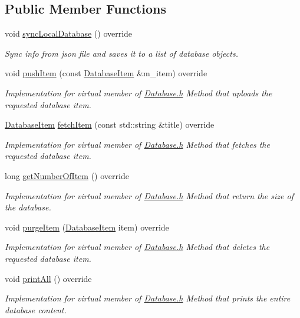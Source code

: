 \subsection*{Public Member Functions}
\begin{DoxyCompactItemize}
\item 
void \hyperlink{classSeriesDatabase_a0ba159b6d52a3cfa07135c7d8b37ef76}{sync\+Local\+Database} () override
\begin{DoxyCompactList}\small\item\em Sync info from json file and saves it to a list of database objects. \end{DoxyCompactList}\item 
void \hyperlink{classSeriesDatabase_a7591f89ab256d9f5a41235f5552e4e23}{push\+Item} (const \hyperlink{classDatabaseItem}{Database\+Item} \&m\+\_\+item) override
\begin{DoxyCompactList}\small\item\em Implementation for virtual member of \hyperlink{Database_8h_source}{Database.\+h} Method that uploads the requested database item. \end{DoxyCompactList}\item 
\hyperlink{classDatabaseItem}{Database\+Item} \hyperlink{classSeriesDatabase_af5303a723910395b31f2e01088de9130}{fetch\+Item} (const std\+::string \&title) override
\begin{DoxyCompactList}\small\item\em Implementation for virtual member of \hyperlink{Database_8h_source}{Database.\+h} Method that fetches the requested database item. \end{DoxyCompactList}\item 
long \hyperlink{classSeriesDatabase_af5fe5a423303eff4489a7679907ef994}{get\+Number\+Of\+Item} () override
\begin{DoxyCompactList}\small\item\em Implementation for virtual member of \hyperlink{Database_8h_source}{Database.\+h} Method that return the size of the database. \end{DoxyCompactList}\item 
void \hyperlink{classSeriesDatabase_a863a35987b5a4de15a121b8b4358e353}{purge\+Item} (\hyperlink{classDatabaseItem}{Database\+Item} item) override
\begin{DoxyCompactList}\small\item\em Implementation for virtual member of \hyperlink{Database_8h_source}{Database.\+h} Method that deletes the requested database item. \end{DoxyCompactList}\item 
void \hyperlink{classSeriesDatabase_ae2bf5323216e0043292494d3f0ac978c}{print\+All} () override
\begin{DoxyCompactList}\small\item\em Implementation for virtual member of \hyperlink{Database_8h_source}{Database.\+h} Method that prints the entire database content. \end{DoxyCompactList}\end{DoxyCompactItemize}
